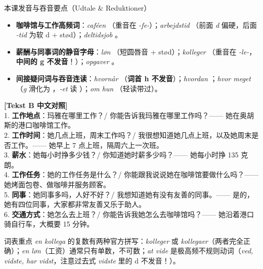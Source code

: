 \begin{tipbox}{本课发音与吞音要点（Udtale \& Reduktioner）}
\begin{itemize}
  \item \textbf{咖啡馆与工作高频词}：\textit{caféen} （重音在 \textit{-fe-}）；\textit{arbejdstid} （前面 \textit{d} 偏硬，后面 \textit{-tid} 为软 d + stød）；\textit{deltidsjob} 。
  \item \textbf{薪酬与同事词的静音字母}：\textit{løn} （短圆唇音 + stød）；\textit{kolleger} （重音在 \textit{-le-}，\textbf{中间的 g 不发音}！）；\textit{opgaver} 。
  \item \textbf{间接疑问词与吞音连读}：\textit{hvornår} （\textbf{词首 h 不发音}）；\textit{hvordan} ；\textit{hvor meget} （\textit{g} 滑化为 ，\textit{-et} 读 ）；\textit{om hun} （轻读带过）。
\end{itemize}
\end{tipbox}

\begin{transbox}
\small
\textbf{\color{NCDTeal}[Tekst B 中文对照]}\\
1. \textbf{工作地点}：玛雅在哪里工作？/ 你能告诉我玛雅在哪里工作吗？—— 她在奥胡斯的港口咖啡馆工作。\\
2. \textbf{工作时间}：她几点上班，周末工作吗？/ 我很想知道她几点上班，以及她周末是否工作。—— 她早上 7 点上班，隔周六上一次班。\\
3. \textbf{薪水}：她每小时挣多少钱？/ 你知道她时薪多少吗？—— 她每小时挣 135 克朗。\\
4. \textbf{工作任务}：她的工作任务是什么？/ 你能跟我说说她在咖啡馆要做什么吗？—— 她烤面包卷、做咖啡并服务顾客。\\
5. \textbf{同事}：她同事多吗，人好不好？/ 我想知道她有没有友善的同事。—— 是的，她有四位同事，大家都非常友善又乐于助人。\\
6. \textbf{交通方式}：她怎么去上班？/ 你能告诉我她怎么去咖啡馆吗？—— 她沿着港口骑自行车，大概要 15 分钟。
\end{transbox}


\begin{tipbox}{词表重点}
\textit{en kollega} 的复数有两种官方拼写：\textit{kolleger} 或 \textit{kollegaer}（两者完全正确）；\textit{en løn}（工资）通常只有单数，不可数；\textit{at vide} 是极高频不规则动词（\textit{ved, vidste, har vidst}，注意过去式 \textit{vidste} 里的 d 不发音！）。
\end{tipbox}

